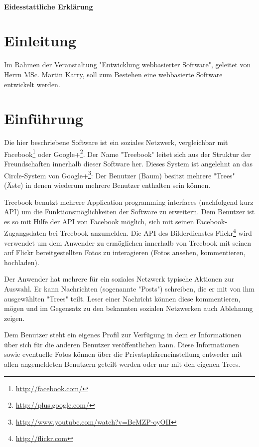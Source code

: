 \documentclass[10pt,a4paper]{book}
\begin{document}
\subsubsection{Eidesstattliche Erklärung}

\tableofcontents
\renewcommand{\chaptername}{}
\renewcommand{\thechapter}{}
\renewcommand{\thesection}{\arabic{section}}
\renewcommand{\thefigure}{\arabic{figure}}

\chapter{Einleitung}
Im Rahmen der Veranstaltung "Entwicklung webbasierter Software", geleitet von Herrn MSc. Martin Karry, soll zum Bestehen eine webbasierte Software entwickelt werden.
\chapter{Einführung}
Die hier beschriebene Software ist ein soziales Netzwerk, vergleichbar mit Facebook\footnote{\href{http://facebook.com/}{http://facebook.com/}
} oder Google+\footnote{\href{http://plus.google.com/}{http://plus.google.com/}}. Der Name "Treebook" leitet sich aus der Struktur der 
Freundschaften innerhalb dieser Software her. Dieses System ist angelehnt an das Circle-System von Google+\footnote{\href{http://www.youtube.
com/watch?v=BeMZP-oyOII}{http://www.youtube.com/watch?v=BeMZP-oyOII}}: Der Benutzer (Baum) besitzt mehrere "Trees" (Äste) in denen wiederum 
mehrere Benutzer enthalten sein können.

Treebook benutzt mehrere Application programming interfaces (nachfolgend kurz API) um die Funktionsmöglichkeiten der Software zu erweitern. 
Dem Benutzer ist es so mit Hilfe der API von Facebook möglich, sich mit seinen Facebook-Zugangsdaten bei Treebook anzumelden. Die API des 
Bilderdienstes Flickr\footnote{\href{http://flickr.com}{http://flickr.com}} wird verwendet um dem Anwender zu ermöglichen innerhalb von 
Treebook mit seinen auf Flickr bereitgestellten Fotos zu interagieren (Fotos ansehen, kommentieren, hochladen).

Der Anwender hat mehrere für ein soziales Netzwerk typische Aktionen zur Auswahl. Er kann Nachrichten (sogenannte "Posts") schreiben, die er 
mit von ihm ausgewählten "Trees" teilt. Leser einer Nachricht können diese kommentieren, mögen und im Gegensatz zu den bekannten sozialen 
Netzwerken auch Ablehnung zeigen.

Dem Benutzer steht ein eigenes Profil zur Verfügung in dem er Informationen über sich für die anderen Benutzer veröffentlichen kann. Diese 
Informationen sowie eventuelle Fotos können über die Privatsphäreneinstellung entweder mit allen angemeldeten Benutzern geteilt werden oder 
nur mit den eigenen Trees.
\end{document}
